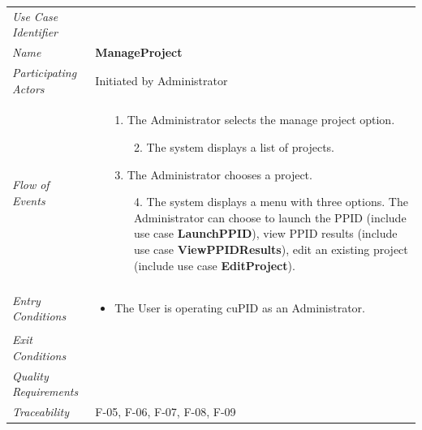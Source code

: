 \documentclass[12pt,letterpaper]{article}
\begin{document}
\begin{center}
  	  \begin{tabu} to 
		\toprule
		Use Case Identifier &  \\
		Name & {\bf ManageProject} \\
   	     Participating Actors & Initiated by Administrator \\
		Flow of Events & 
		\begin{minipage}[t]{\linewidth}
		    \begin{enumerate}
			    \item[1.] The Administrator selects the manage project option.
			    \begin{enumerate}
			        \item[2.] The system displays a list of projects.
				\end{enumerate}
				\item[3.] The Administrator chooses a project.
				\begin{enumerate}
				    \item[4.] The system displays a menu with three options. The Administrator can choose to launch the PPID (include use case \textbf{LaunchPPID}), view PPID results (include use case \textbf{ViewPPIDResults}), edit an existing project (include use case \textbf{EditProject}).
				\end{enumerate}
			\end{enumerate}
	    \end{minipage} \\

		Entry Conditions &
		\begin{minipage}[t]{\linewidth}
			\begin{itemize}
			    \item The User is operating cuPID as an Administrator.
	        \end{itemize}
	    \end{minipage} \\

		Exit Conditions & \\

		Quality Requirements & \\

		Traceability & F-05, F-06, F-07, F-08, F-09\\
        \toprule
    \end{tabu}
\end{center}

\newpage{}
\end{document}
